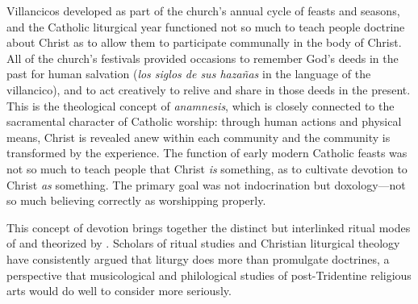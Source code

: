 Villancicos developed as part of the church's annual cycle of feasts and
seasons, and the Catholic liturgical year functioned not so much to teach people
doctrine about Christ as to allow them to participate communally in the body of
Christ.
All of the church's festivals provided occasions to remember God's deeds in the
past for human salvation (\emph{los siglos de sus hazañas} in the language of
the villancico), and to act creatively to relive and share in those deeds in the
present.
This is the theological concept of \emph{anamnesis}, which is closely connected
to the sacramental character of Catholic worship: through human actions and
physical means, Christ is revealed anew within each community and the community
is transformed by the experience.%
    \Autocite
    [For an influential modern Catholic theology of the function of liturgical
    feasts, see][3--4, 12--23]{Taft:LiturgicalYear}
The function of early modern Catholic feasts was not so much to teach people
that Christ \emph{is} something, as to cultivate devotion to Christ \emph{as}
something.
The primary goal was not indocrination but doxology---not so much believing
correctly as worshipping properly.%
\begin{Footnote}
    This concept of devotion brings together the distinct but interlinked ritual
    modes of  and  theorized by
    \autocite[54--62]{Grimes:Beginnings}.
    Scholars of ritual studies and Christian liturgical theology have
    consistently argued that liturgy does more than promulgate doctrines, a
    perspective that musicological and philological studies of post-Tridentine
    religious arts would do well to consider more seriously.
\end{Footnote}

